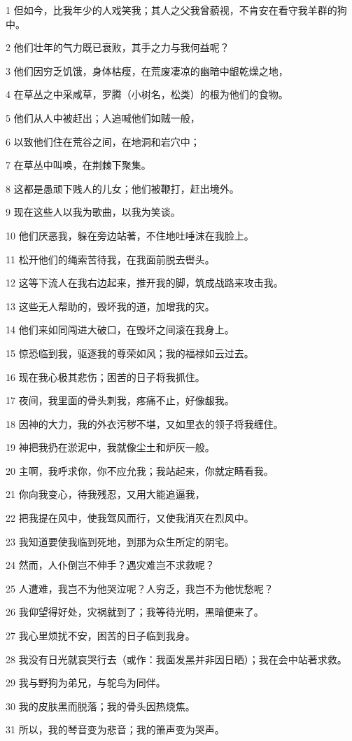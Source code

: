 \par 1 但如今，比我年少的人戏笑我；其人之父我曾藐视，不肯安在看守我羊群的狗中。
\par 2 他们壮年的气力既已衰败，其手之力与我何益呢？
\par 3 他们因穷乏饥饿，身体枯瘦，在荒废凄凉的幽暗中龈乾燥之地，
\par 4 在草丛之中采咸草，罗腾（小树名，松类）的根为他们的食物。
\par 5 他们从人中被赶出；人追喊他们如贼一般，
\par 6 以致他们住在荒谷之间，在地洞和岩穴中；
\par 7 在草丛中叫唤，在荆棘下聚集。
\par 8 这都是愚顽下贱人的儿女；他们被鞭打，赶出境外。
\par 9 现在这些人以我为歌曲，以我为笑谈。
\par 10 他们厌恶我，躲在旁边站著，不住地吐唾沫在我脸上。
\par 11 松开他们的绳索苦待我，在我面前脱去辔头。
\par 12 这等下流人在我右边起来，推开我的脚，筑成战路来攻击我。
\par 13 这些无人帮助的，毁坏我的道，加增我的灾。
\par 14 他们来如同闯进大破口，在毁坏之间滚在我身上。
\par 15 惊恐临到我，驱逐我的尊荣如风；我的福禄如云过去。
\par 16 现在我心极其悲伤；困苦的日子将我抓住。
\par 17 夜间，我里面的骨头刺我，疼痛不止，好像龈我。
\par 18 因神的大力，我的外衣污秽不堪，又如里衣的领子将我缠住。
\par 19 神把我扔在淤泥中，我就像尘土和炉灰一般。
\par 20 主啊，我呼求你，你不应允我；我站起来，你就定睛看我。
\par 21 你向我变心，待我残忍，又用大能追逼我，
\par 22 把我提在风中，使我驾风而行，又使我消灭在烈风中。
\par 23 我知道要使我临到死地，到那为众生所定的阴宅。
\par 24 然而，人仆倒岂不伸手？遇灾难岂不求救呢？
\par 25 人遭难，我岂不为他哭泣呢？人穷乏，我岂不为他忧愁呢？
\par 26 我仰望得好处，灾祸就到了；我等待光明，黑暗便来了。
\par 27 我心里烦扰不安，困苦的日子临到我身。
\par 28 我没有日光就哀哭行去（或作：我面发黑并非因日晒）；我在会中站著求救。
\par 29 我与野狗为弟兄，与鸵鸟为同伴。
\par 30 我的皮肤黑而脱落；我的骨头因热烧焦。
\par 31 所以，我的琴音变为悲音；我的箫声变为哭声。

